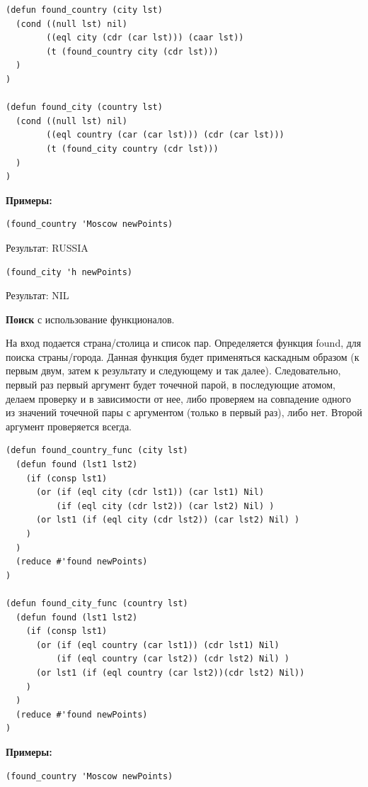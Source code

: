 \documentclass[a4paper,14pt]{extreport} %
\begin{document}
\begin{enumerate}
\begin{lstlisting}
(defun found_country (city lst)
  (cond ((null lst) nil)
        ((eql city (cdr (car lst))) (caar lst))
        (t (found_country city (cdr lst)))
  )
)

(defun found_city (country lst)
  (cond ((null lst) nil)
        ((eql country (car (car lst))) (cdr (car lst)))
        (t (found_city country (cdr lst)))
  )
)
\end{lstlisting}

\textbf{Примеры: }
\begin{lstlisting}
(found_country 'Moscow newPoints)
\end{lstlisting}

Результат: RUSSIA

\begin{lstlisting}
(found_city 'h newPoints)
\end{lstlisting}

Результат: NIL

\textbf{Поиск} с использование функционалов. 

На вход подается страна/столица и список пар. Определяется функция found, для поиска страны/города. Данная функция будет применяться каскадным образом (к первым двум, затем к результату и следующему и так далее). Следовательно, первый раз первый аргумент будет точечной парой, в последующие атомом, делаем проверку и в зависимости от нее, либо проверяем на совпадение одного из значений точечной пары с аргументом (только в первый раз), либо нет. Второй аргумент проверяется всегда. 

\begin{lstlisting}
(defun found_country_func (city lst)
  (defun found (lst1 lst2)
    (if (consp lst1)
      (or (if (eql city (cdr lst1)) (car lst1) Nil)
          (if (eql city (cdr lst2)) (car lst2) Nil) )
      (or lst1 (if (eql city (cdr lst2)) (car lst2) Nil) )
    )
  )
  (reduce #'found newPoints)
)

(defun found_city_func (country lst)
  (defun found (lst1 lst2)
    (if (consp lst1)
      (or (if (eql country (car lst1)) (cdr lst1) Nil)
          (if (eql country (car lst2)) (cdr lst2) Nil) )
      (or lst1 (if (eql country (car lst2))(cdr lst2) Nil))
    )
  )
  (reduce #'found newPoints)
)
\end{lstlisting}

\textbf{Примеры: }
\begin{lstlisting}
(found_country 'Moscow newPoints)
\end{lstlisting}


\end{enumerate}
\end{document}

